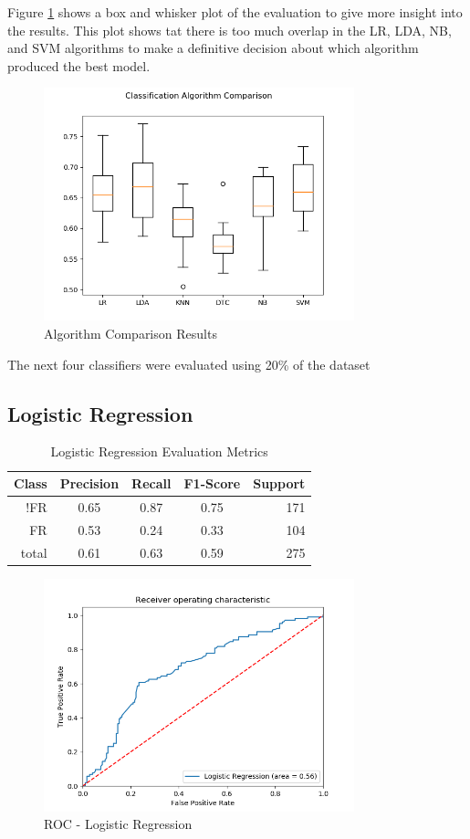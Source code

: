 \documentclass{article}
\begin{document}
Figure \ref{fig:algs} shows a box and whisker plot of the evaluation to give more insight into the results. This plot shows tat there is too much overlap in the LR, LDA, NB, and SVM algorithms to make a definitive decision about which algorithm produced the best model. 

\begin{figure}[h]
\includegraphics[width=9cm]{images/AlgorithmResults.png}
\caption{Algorithm Comparison Results}\label{fig:algs}
\centering
\end{figure}

The next four classifiers were evaluated using 20\% of the dataset
\subsection{Logistic Regression}

\begin{table}[!htb]
\setlength\tabcolsep{0pt} %
\footnotesize\centering
\smallskip 
\begin{tabular*}{\columnwidth}{@{\extracolsep{\fill}}rcccr}
\toprule
  Class&Precision&Recall&F1-Score&Support \\
\midrule
  !FR  & 0.65&0.87&0.75&171\\
  FR & 0.53&0.24&0.33&104 \\
  \midrule
total&0.61&0.63&0.59&275\\
\bottomrule
\end{tabular*}
\caption{Logistic Regression Evaluation Metrics} \label{tab:lda}
\end{table}

\begin{figure}[h]
\includegraphics[width=9cm]{images/roc-lr.png}
\caption{ROC - Logistic Regression}\label{fig:lr}
\centering
\end{figure}
\end{document}

